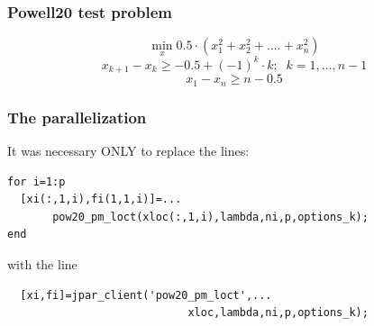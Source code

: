 \documentclass{beamer}
\newcommand{\beq}{\begin{equation}}
\newcommand{\eeq}{\end{equation}}
\begin{document}
\begin{frame}
   \frametitle{Powell20 test problem}
   \beq
   \min_{x} 0.5 \cdot ( x_1^2+x_2^2+....+x_n^2 )
   \eeq
   \beq
   x_{k+1}-x_{k} \geq -0.5+(-1)^k\cdot k; \;\; k=1,\ldots,n-1
   \eeq
   \beq
   x_1-x_n \geq n-0.5
   \eeq
\end{frame}
\begin{frame}[fragile]
   \frametitle{The parallelization}
   It was necessary ONLY to replace the lines:
   \begin{verbatim}
for i=1:p
  [xi(:,1,i),fi(1,1,i)]=...
       pow20_pm_loct(xloc(:,1,i),lambda,ni,p,options_k);
end
\end{verbatim}
   with the line
   \begin{verbatim}
  [xi,fi]=jpar_client('pow20_pm_loct',...
                            xloc,lambda,ni,p,options_k);
\end{verbatim}
\end{frame}
\end{document}
